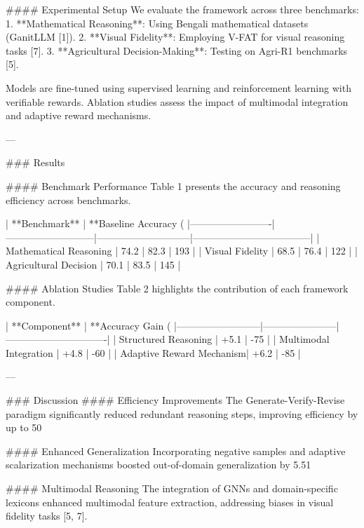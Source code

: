 #### Experimental Setup
We evaluate the framework across three benchmarks:
1. **Mathematical Reasoning**: Using Bengali mathematical datasets (GanitLLM [1]).
2. **Visual Fidelity**: Employing V-FAT for visual reasoning tasks [7].
3. **Agricultural Decision-Making**: Testing on Agri-R1 benchmarks [5].

Models are fine-tuned using supervised learning and reinforcement learning with verifiable rewards. Ablation studies assess the impact of multimodal integration and adaptive reward mechanisms.

---

### Results

#### Benchmark Performance
Table 1 presents the accuracy and reasoning efficiency across benchmarks.

| **Benchmark**          | **Baseline Accuracy (%
|-------------------------|---------------------------|-----------------------------|------------------------------------|
| Mathematical Reasoning  | 74.2                     | 82.3                        | 193                                |
| Visual Fidelity         | 68.5                     | 76.4                        | 122                                |
| Agricultural Decision   | 70.1                     | 83.5                        | 145                                |

#### Ablation Studies
Table 2 highlights the contribution of each framework component.

| **Component**           | **Accuracy Gain (%
|--------------------------|-----------------------|-------------------------------|
| Structured Reasoning     | +5.1                 | -75                           |
| Multimodal Integration   | +4.8                 | -60                           |
| Adaptive Reward Mechanism| +6.2                 | -85                           |

---

### Discussion
#### Efficiency Improvements
The Generate-Verify-Revise paradigm significantly reduced redundant reasoning steps, improving efficiency by up to 50%

#### Enhanced Generalization
Incorporating negative samples and adaptive scalarization mechanisms boosted out-of-domain generalization by 5.51%

#### Multimodal Reasoning
The integration of GNNs and domain-specific lexicons enhanced multimodal feature extraction, addressing biases in visual fidelity tasks [5, 7].

